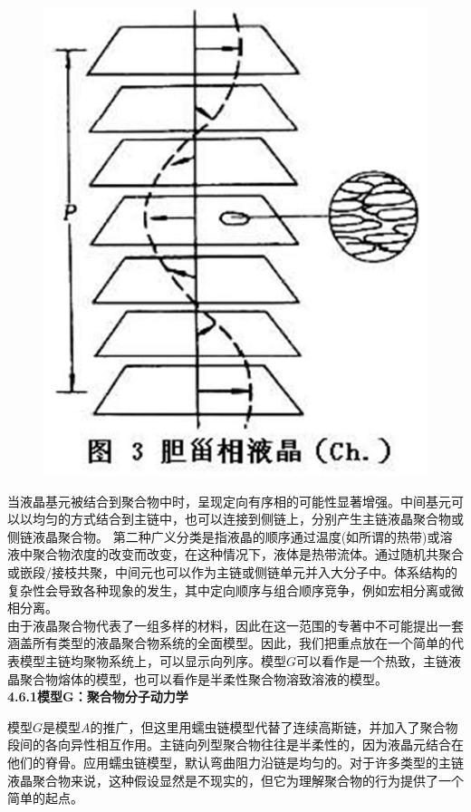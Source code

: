 \begin{figure}[H]
	\centering   
	\includegraphics[width=12cm]{./figures/5.png}
\end{figure}

当液晶基元被结合到聚合物中时，呈现定向有序相的可能性显著增强。中间基元可以以均匀的方式结合到主链中，也可以连接到侧链上，分别产生主链液晶聚合物或侧链液晶聚合物。 第二种广义分类是指液晶的顺序通过温度(如所谓的热带)或溶液中聚合物浓度的改变而改变，在这种情况下，液体是热带流体。通过随机共聚合或嵌段/接枝共聚，中间元也可以作为主链或侧链单元并入大分子中。体系结构的复杂性会导致各种现象的发生，其中定向顺序与组合顺序竞争，例如宏相分离或微相分离。\\

由于液晶聚合物代表了一组多样的材料，因此在这一范围的专著中不可能提出一套涵盖所有类型的液晶聚合物系统的全面模型。因此，我们把重点放在一个简单的代表模型主链均聚物系统上，可以显示向列序。模型$G$可以看作是一个热致，主链液晶聚合物熔体的模型，也可以看作是半柔性聚合物溶致溶液的模型。\\


\textbf{4.6.1模型G：聚合物分子动力学}

模型$G$是模型$A$的推广，但这里用蠕虫链模型代替了连续高斯链，并加入了聚合物段间的各向异性相互作用。主链向列型聚合物往往是半柔性的，因为液晶元结合在他们的脊骨。应用蠕虫链模型，默认弯曲阻力沿链是均匀的。对于许多类型的主链液晶聚合物来说，这种假设显然是不现实的，但它为理解聚合物的行为提供了一个简单的起点。\\

